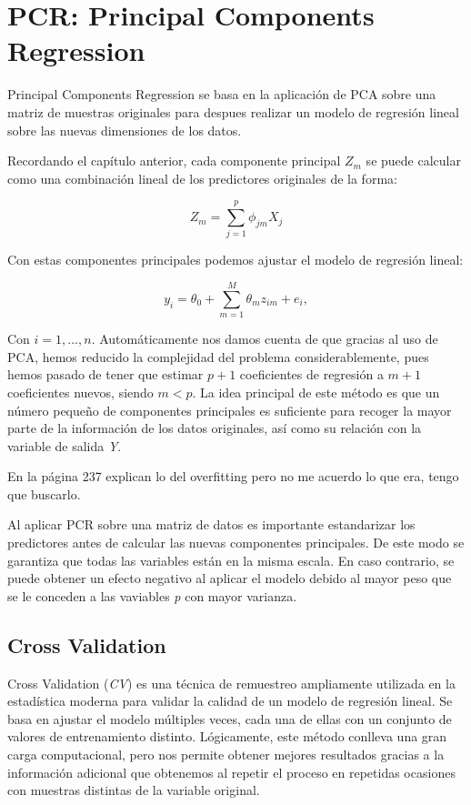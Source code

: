 \documentclass[12pt,a4paper,Spanish]{book}
\begin{document}
\chapter{PCR: Principal Components Regression}

Principal Components Regression se basa en la aplicación de PCA sobre una matriz de muestras originales para despues realizar un modelo de regresión lineal sobre las nuevas dimensiones de los datos.

Recordando el capítulo anterior, cada componente principal $Z_m$ se puede calcular como una combinación lineal de los predictores originales de la forma:

\begin{equation}
Z_m=\sum_{j=1}^{p}\phi_{jm}X_{j}
\end{equation}

Con estas componentes principales podemos ajustar el modelo de regresión lineal:

\begin{equation}
y_i = \theta_0+\sum_{m=1}^{M}\theta_mz_{im}+e_i,      
\end{equation}

Con $i=1,...,n$. Automáticamente nos damos cuenta de que gracias al uso de PCA, hemos reducido la complejidad del problema considerablemente, pues hemos pasado de tener que estimar $p+1$ coeficientes de regresión a $m+1$ coeficientes nuevos, siendo $m<p$. La idea principal de este método es que un número pequeño de componentes principales es suficiente para recoger la mayor parte de la información de los datos originales, así como su relación con la variable de salida \textit{Y}.

En la página 237 explican lo del overfitting pero no me acuerdo lo que era, tengo que buscarlo.

Al aplicar PCR sobre una matriz de datos es importante estandarizar los predictores antes de calcular las nuevas componentes principales. De este modo se garantiza que todas las variables están en la misma escala. En caso contrario, se puede obtener un efecto negativo al aplicar el modelo debido al mayor peso que se le conceden a las vaviables \textit{p} con mayor varianza.

\section{Cross Validation}

Cross Validation (\textit{CV}) es una técnica de remuestreo ampliamente utilizada en la estadística moderna para validar la calidad de un modelo de regresión lineal. Se basa en ajustar el modelo múltiples veces, cada una de ellas con un conjunto de valores de entrenamiento distinto. Lógicamente, este método conlleva una gran carga computacional, pero nos permite obtener mejores resultados gracias a la información adicional que obtenemos al repetir el proceso en repetidas ocasiones con muestras distintas de la variable original.
\end{document}
